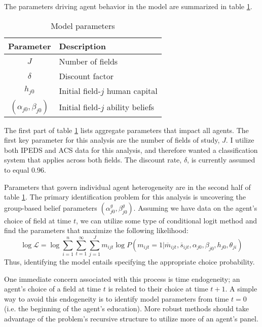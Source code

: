 \documentclass[11 pt]{article}
\begin{document}
The parameters driving agent behavior in the model are summarized in table \ref{tab:parameter_descriptions}.
\begin{table}
\centering
\caption{Model parameters}
\label{tab:parameter_descriptions}
\begin{tabular}{cl}
\hline \hline
Parameter & Description %
\\ \hline
$J$ & Number of fields %
\\
$\delta$ & Discount factor
\\ \hline
$h_{j0}$ & Initial field-$j$ human capital
\\
$(\alpha_{j0}, \beta_{j0})$ & Initial field-$j$ ability beliefs
\\ \hline \hline
\end{tabular}
\end{table}
The first part of table \ref{tab:parameter_descriptions} lists aggregate parameters that impact all agents. 
The first key parameter for this analysis are the number of fields of study, $J$. 
I utilize both IPEDS and ACS data for this analysis, and therefore wanted a classification system that applies across both fields. 
The discount rate, $\delta$, is currently assumed to equal $0.96$.

Parameters that govern individual agent heterogeneity are in the second half of table \ref{tab:parameter_descriptions}.
The primary identification problem for this analysis is uncovering the group-based belief parameters $(\alpha_{j0}^g, \beta_{j0}^g)$.
Assuming we have data on the agent's choice of field at time $t$, we can utilize some type of conditional logit method and find the parameters that maximize the following likelihood:
\begin{equation*}
    \log \mathcal{L} = \log \sum_{i = 1}^n \sum_{t=1}^\infty \sum_{j=1}^J m_{ijt} \log P(m_{ijt} = 1 \vert \overline{m}_{ijt}, \overline{s}_{ijt}, \alpha_{j0}, \beta_{j0}, h_{j0}, \theta_{ji})
\end{equation*}
Thus, identifying the model entails specifying the appropriate choice probability. 

One immediate concern associated with this process is time endogeneity; an agent's choice of a field at time $t$ is related to their choice at time $t+1$. A simple way to avoid this endogeneity is to identify model parameters from time $t=0$ (i.e. the beginning of the agent's education).
More robust methods should take advantage of the problem's recursive structure to utilize more of an agent's panel. 
\end{document}
